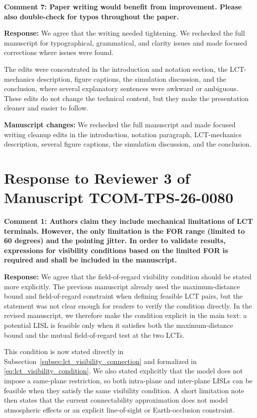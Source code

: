 \documentclass[journal,12pt,onecolumn,draftclsnofoot,]{IEEEtran}
\begin{document}
\textbf{Comment 7: Paper writing would benefit from improvement. Please also double-check for typos throughout the paper.}

\textbf{Response:} We agree that the writing needed tightening. We rechecked the full manuscript for typographical, grammatical, and clarity issues and made focused corrections where issues were found.

The edits were concentrated in the introduction and notation section, the LCT-mechanics description, figure captions, the simulation discussion, and the conclusion, where several explanatory sentences were awkward or ambiguous. These edits do not change the technical content, but they make the presentation cleaner and easier to follow.

\textbf{Manuscript changes:} We rechecked the full manuscript and made focused writing cleanup edits in the introduction, notation paragraph, LCT-mechanics description, several figure captions, the simulation discussion, and the conclusion.



\section*{\centering\Large\textbf{Response to Reviewer 3 of Manuscript TCOM-TPS-26-0080}}

\textbf{Comment 1: Authors claim they include mechanical limitations of LCT terminals. However, the only limitation is the FOR range (limited to 60 degrees) and the pointing jitter. In order to validate results, expressions for visibility conditions based on the limited FOR is required and shall be included in the manuscript.}

\textbf{Response:} We agree that the field-of-regard visibility condition should be stated more explicitly. The previous manuscript already used the maximum-distance bound and field-of-regard constraint when defining feasible LCT pairs, but the statement was not clear enough for readers to verify the condition directly. In the revised manuscript, we therefore make the condition explicit in the main text: a potential LISL is feasible only when it satisfies both the maximum-distance bound and the mutual field-of-regard test at the two LCTs.

This condition is now stated directly in Subsection~\ref{subsec:lct_visibility_connection} and formalized in \eqref{eq:lct_visibility_condition}. We also stated explicitly that the model does not impose a same-plane restriction, so both intra-plane and inter-plane LISLs can be feasible when they satisfy the same visibility condition. A short limitation note then states that the current connectability approximation does not model atmospheric effects or an explicit line-of-sight or Earth-occlusion constraint.
\end{document}

